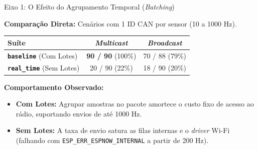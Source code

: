 \begin{frame}{Eixo 1: O Efeito do Agrupamento Temporal (\textit{Batching})}
    
    \textbf{Comparação Direta:} Cenários com 1 ID CAN por sensor (10 a 1000 Hz).
    
    \vspace{0.2cm}
    \begin{table}[]
        \centering
        \small
        \renewcommand{\arraystretch}{1.4}
        \begin{tabular}{l | c | c}
            \hline
            \textbf{Suíte} & \textbf{\textit{Multicast}} & \textbf{\textit{Broadcast}} \\
            \hline
            \textbf{\texttt{baseline}} (Com Lotes) & \textbf{90 / 90} (100\%) & 70 / 88 (79\%) \\
            \hline
            \textbf{\texttt{real\_time}} (Sem Lotes) & 20 / 90 (22\%) & 18 / 90 (20\%) \\
            \hline
        \end{tabular}
    \end{table}

    \vspace{0.4cm}
    \textbf{Comportamento Observado:}
    \begin{itemize}
        \item \textbf{Com Lotes:} Agrupar amostras no pacote amortece o custo fixo de acesso ao rádio, suportando envios de até 1000 Hz.
        \item \textbf{Sem Lotes:} A taxa de envio satura as filas internas e o \textit{driver} Wi-Fi (falhando com \texttt{ESP\_ERR\_ESPNOW\_INTERNAL} a partir de 200 Hz).
    \end{itemize}
\end{frame}

